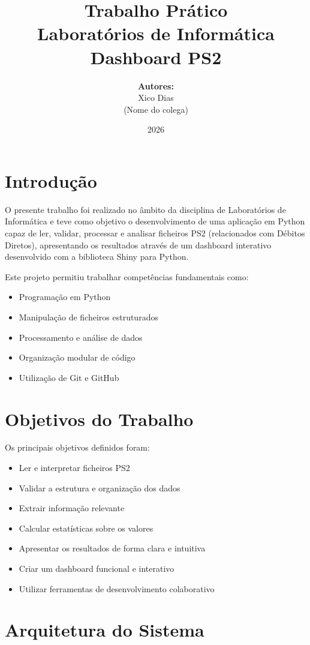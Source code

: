 \documentclass[12pt]{article}
\title{
\Huge \textbf{Trabalho Prático}\\[10pt]
\Large Laboratórios de Informática\\[10pt]
\Large Dashboard PS2
}
\author{
\textbf{Autores:}\\
Xico Dias\\
(Nome do colega)
}
\date{2026}
\begin{document}
\maketitle
\newpage

\tableofcontents
\newpage

\section{Introdução}

O presente trabalho foi realizado no âmbito da disciplina de Laboratórios de Informática e teve como objetivo o desenvolvimento de uma aplicação em Python capaz de ler, validar, processar e analisar ficheiros PS2 (relacionados com Débitos Diretos), apresentando os resultados através de um dashboard interativo desenvolvido com a biblioteca Shiny para Python.

Este projeto permitiu trabalhar competências fundamentais como:
\begin{itemize}
\item Programação em Python
\item Manipulação de ficheiros estruturados
\item Processamento e análise de dados
\item Organização modular de código
\item Utilização de Git e GitHub
\end{itemize}

\section{Objetivos do Trabalho}

Os principais objetivos definidos foram:

\begin{itemize}
\item Ler e interpretar ficheiros PS2
\item Validar a estrutura e organização dos dados
\item Extrair informação relevante
\item Calcular estatísticas sobre os valores
\item Apresentar os resultados de forma clara e intuitiva
\item Criar um dashboard funcional e interativo
\item Utilizar ferramentas de desenvolvimento colaborativo
\end{itemize}

\section{Arquitetura do Sistema}
\end{document}
